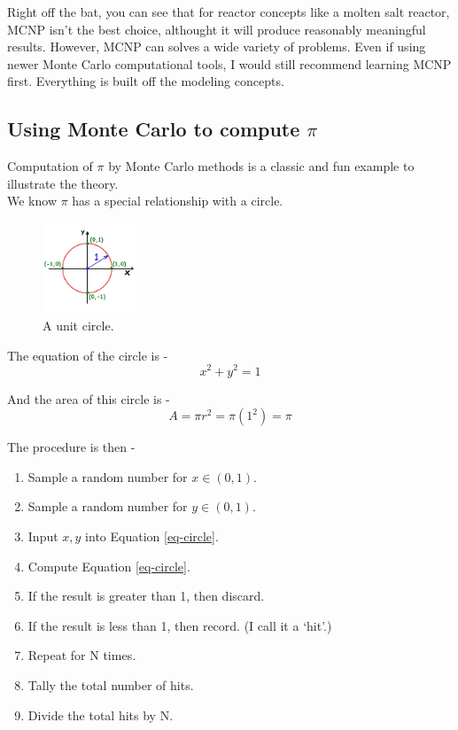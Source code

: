 \documentclass[11pt,a4paper]{article}
\begin{document}
\noindent Right off the bat, you can see that for reactor concepts like a molten salt reactor, MCNP isn't the best choice, althought it will produce reasonably meaningful results. However, MCNP can solves a wide variety of problems. Even if using newer Monte Carlo computational tools, I would still recommend learning MCNP first. Everything is built off the modeling concepts. 

\subsection{Using Monte Carlo to compute $\pi$}
\noindent Computation of $\pi$ by Monte Carlo methods is a classic and fun example to illustrate the theory.\\

\noindent We know $\pi$ has a special relationship with a circle. 

\begin{figure}[h!]
    \centering
    \includegraphics[width=0.25\textwidth]{circle.png}
    \caption{A unit circle.}
    \label{fig-circle}
\end{figure}

\noindent The equation of the circle is - 
\begin{equation} \label{eq-circle}
    x^2 + y^2 = 1
\end{equation}

\noindent And the area of this circle is - 
\begin{equation} \label{eq-area}
    A = \pi r^2 = \pi (1^2) = \pi
\end{equation}

\noindent The procedure is then - 
\begin{enumerate}[topsep=0pt,itemsep=-1ex,partopsep=1ex,parsep=1ex]
    \item Sample a random number for $x \in (0,1)$.
    \item Sample a random number for $y \in (0,1)$.
    \item Input $x,y$ into Equation \ref{eq-circle}.
    \item Compute Equation \ref{eq-circle}.
    \item If the result is greater than 1, then discard.
    \item If the result is less than 1, then record. (I call it a `hit'.)
    \item Repeat for N times. 
    \item Tally the total number of hits. 
    \item Divide the total hits by N.
\end{enumerate}
\vspace*{\baselineskip}
\end{document}
